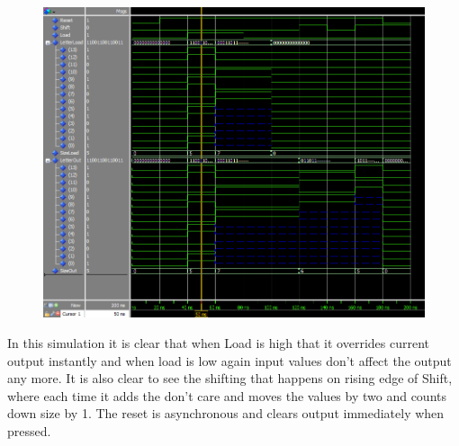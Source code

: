 \documentclass{article}
\begin{document}
\clearpage
\begin{figure}[h]
    \centering
    \includegraphics[width=1\textwidth]{Figures/LetterRegisterTB.PNG}
    \label{fig:TB_Reg}
\end{figure}
In this simulation it is clear that when Load is high that it overrides current output instantly and when load is low again input values don't affect the output any more. It is also clear to see the shifting that happens on rising edge of Shift, where each time it adds the don't care and moves the values by two and counts down size by 1. The reset is asynchronous and clears output immediately when pressed.
\end{document}
